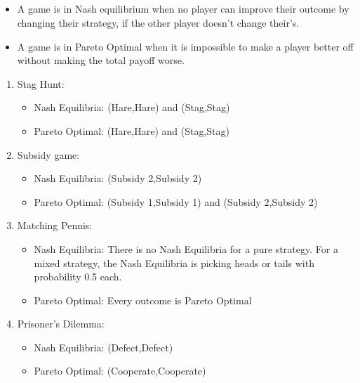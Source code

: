 \documentclass[12pt,letterpaper, onecolumn]{exam}
\begin{document}
\subsection{}
\begin{itemize}
    \item A game is in Nash equilibrium when no player can improve their outcome by changing their strategy, if the other player doesn't change their's.
    \item A game is in Pareto Optimal when it is impossible to make a player better off without making the total payoff worse.
\end{itemize}
\begin{enumerate}[(\alph*)]
    \item Stag Hunt:
    \begin{itemize}
        \item Nash Equilibria: (Hare,Hare) and (Stag,Stag)
        \item Pareto Optimal: (Hare,Hare) and (Stag,Stag)
    \end{itemize}
    \item Subsidy game:
    \begin{itemize}
        \item Nash Equilibria: (Subsidy 2,Subsidy 2)
        \item Pareto Optimal: (Subsidy 1,Subsidy 1) and (Subsidy 2,Subsidy 2)
    \end{itemize}
    \item Matching Pennis:
    \begin{itemize}
        \item Nash Equilibria: There is no Nash Equilibria for a pure strategy. For a mixed strategy, the Nash Equilibria is picking heads or tails with probability 0.5 each.
        \item Pareto Optimal: Every outcome is Pareto Optimal
    \end{itemize}
    \item Prisoner's Dilemma:
    \begin{itemize}
        \item Nash Equilibria: (Defect,Defect)
        \item Pareto Optimal: (Cooperate,Cooperate)
    \end{itemize}
\end{enumerate}

\subsection{}
\end{document}
